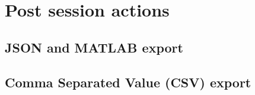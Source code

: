 \chapter{Post session actions}
\label{ch:PostSessionActions}

\section{JSON and MATLAB export}
\label{sec:DataExport}

\section{Comma Separated Value (CSV) export}
\label{sec:CSVExport}


